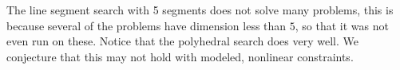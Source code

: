 \documentclass{article}
\begin{document}
The line segment search with 5 segments does not solve many problems, this is because several of the problems have dimension less than $5$, so that it was not even run on these.
Notice that the polyhedral search does very well.
We conjecture that this may not hold with modeled, nonlinear constraints.



% 
% 
% 




\end{document}
